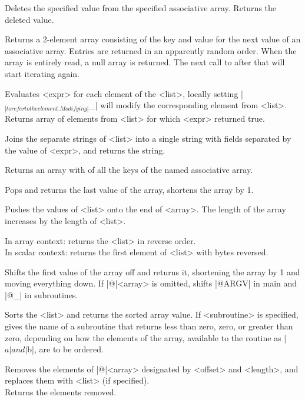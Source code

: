 \begin{enum}{1cm}

Deletes the specified value from the specified associative array.
Returns the deleted value. 

Returns a 2-element array consisting of the key and value for the next
value of an associative array. Entries are returned in an apparently
random order. When the array is entirely read, a null array is
returned. The next call to  after that will start iterating again.

Evaluates <expr> for each element of the <list>, locally setting |$_|
to refer to the element. Modifying |$_| will modify the corresponding
element from <list>. Returns array of elements from <list> for which
<expr> returned true. 

Joins the separate strings of <list> into a single string with fields
separated by the value of <expr>, and returns the string.

Returns an array with of all the keys of the named
associative array.

Pops and returns the last value of the array, shortens the array by 1. 

Pushes the values of <list> onto the end of <array>. The length of the
array increases by the length of <list>.

In array context: returns the <list> in reverse order. \\
In scalar
context: returns the first element of <list> with bytes reversed. 

Shifts the first value of the array off and returns it, shortening the
array by 1 and moving everything down. If |@|<array> is omitted, shifts
|@ARGV| in main and |@_| in subroutines.  

Sorts the <list> and returns the sorted array value. If <subroutine>
is specified, gives the name of a subroutine that returns less than
zero, zero, or greater than zero, depending on how the elements of the
array, available to the routine as |$a| and |$b|, are to be ordered.

Removes the elements of |@|<array> designated by <offset> and
<length>, and replaces them with <list> (if specified). \\
Returns the elements removed.


\end{enum}
